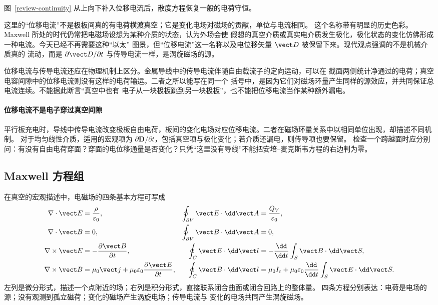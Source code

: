 图~\ref{review-continuity} 从上向下补入位移电流后，散度方程恢复一般的电荷守恒。

\continuityDiagram

这里的“位移电流”不是极板间真的有电荷横渡真空；它是变化电场对磁场的贡献，单位与电流相同。
这个名称带有明显的历史色彩。Maxwell 所处的时代仍常把电磁场设想为某种介质的状态，认为外场会使
假想的真空介质或真实电介质发生极化，极化状态的变化仿佛形成一种电流。今天已经不再需要这种“以太”
图景，但“位移电流”这一名称以及电位移矢量 $\vect D$ 被保留下来。现代观点强调的不是机械介质真的
流动，而是 $\partial\vect D/\partial t$ 与传导电流一样，是涡旋磁场的源。

位移电流与传导电流还应在物理机制上区分。金属导线中的传导电流伴随自由载流子的定向运动，可以在
截面两侧统计净通过的电荷；真空电容间隙中的位移电流则没有这样的电荷输运。二者之所以能写在同一个
括号中，是因为它们对磁场环量产生同样的源效应，并共同保证总电流连续。不能据此断言“真空中也有
电子从一块极板跳到另一块极板”，也不能把位移电流当作某种额外漏电。


\paragraph{位移电流不是电子穿过真空间隙}
平行板充电时，导线中传导电流改变极板自由电荷，板间的变化电场对应位移电流。二者在磁场环量关系中以相同单位出现，却描述不同机制。
对于均匀线性介质，适用的宏观项为 $\partial\boldsymbol D/\partial t$，包括真空项与极化变化；若介质还漏电，则传导项也要保留。
检查一个跨越面时应分别问：有没有自由电荷穿面？穿面的电位移通量是否变化？只凭“这里没有导线”不能把安培--麦克斯韦方程的右边判为零。

\subsection{Maxwell 方程组}

在真空的宏观描述中，电磁场的四条基本方程可写成
\begin{align}
  \nabla\cdot\vect E&=\frac{\rho}{\varepsilon_0},
  &\oint_{\partial V}\vect E\cdot\dd\vect A&=\frac{Q_V}{\varepsilon_0},
  \\
  \nabla\cdot\vect B&=0,
  &\oint_{\partial V}\vect B\cdot\dd\vect A&=0,
  \\
  \nabla\times\vect E&=-\frac{\partial\vect B}{\partial t},
  &\oint_C\vect E\cdot\dd\vect l&=-\frac{\dd}{\dd t}\int_S\vect B\cdot\dd\vect S,
  \\
  \nabla\times\vect B&=\mu_0\vect j+\mu_0\varepsilon_0
  \frac{\partial\vect E}{\partial t},
  &\oint_C\vect B\cdot\dd\vect l&=\mu_0 I_{\rm c}+\mu_0\varepsilon_0
  \frac{\dd}{\dd t}\int_S\vect E\cdot\dd\vect S.
\end{align}
左列是微分形式，描述一个点附近的场；右列是积分形式，直接联系闭合曲面或闭合回路上的整体量。
四条方程分别表达：电荷是电场的源；没有观测到孤立磁荷；变化的磁场产生涡旋电场；传导电流与
变化的电场共同产生涡旋磁场。

